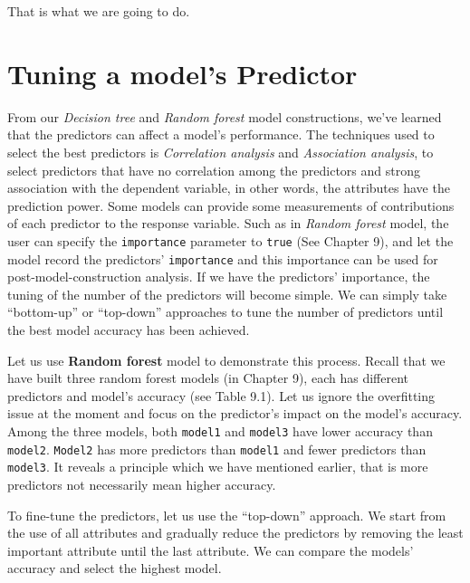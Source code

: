 \documentclass[
]{book}
\begin{document}
That is what we are going to do.

\hypertarget{tuning-a-models-predictor}{%
\section{Tuning a model's Predictor}\label{tuning-a-models-predictor}}

From our \emph{Decision tree} and \emph{Random forest} model constructions, we've learned that the predictors can affect a model's performance. The techniques used to select the best predictors is \emph{Correlation analysis} and \emph{Association analysis}, to select predictors that have no correlation among the predictors and strong association with the dependent variable, in other words, the attributes have the prediction power. Some models can provide some measurements of contributions of each predictor to the response variable. Such as in \emph{Random forest} model, the user can specify the \texttt{importance} parameter to \texttt{true} (See Chapter 9), and let the model record the predictors' \texttt{importance} and this importance can be used for post-model-construction analysis. If we have the predictors' importance, the tuning of the number of the predictors will become simple. We can simply take ``bottom-up'' or ``top-down'' approaches to tune the number of predictors until the best model accuracy has been achieved.

Let us use \textbf{Random forest} model to demonstrate this process. Recall that we have built three random forest models (in Chapter 9), each has different predictors and model's accuracy (see Table 9.1). Let us ignore the overfitting issue at the moment and focus on the predictor's impact on the model's accuracy. Among the three models, both \texttt{model1} and \texttt{model3} have lower accuracy than \texttt{model2}. \texttt{Model2} has more predictors than \texttt{model1} and fewer predictors than \texttt{model3}. It reveals a principle which we have mentioned earlier, that is more predictors not necessarily mean higher accuracy.

To fine-tune the predictors, let us use the ``top-down'' approach. We start from the use of all attributes and gradually reduce the predictors by removing the least important attribute until the last attribute. We can compare the models' accuracy and select the highest model.
\end{document}
